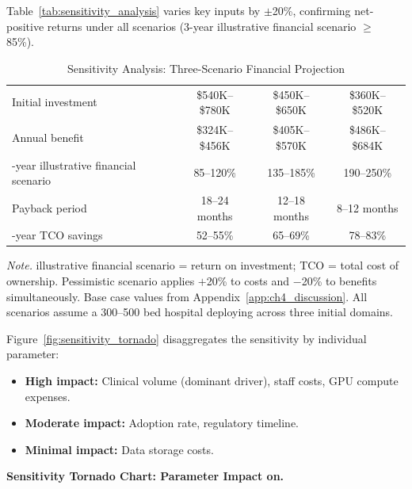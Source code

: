 Table~\ref{tab:sensitivity_analysis} varies key inputs by $\pm$20\%, confirming net-positive returns under all scenarios (3-year illustrative financial scenario $\geq$ 85\%).

\begin{table}[H]
\tablestripes
\tablefontsize
\caption{Sensitivity Analysis: Three-Scenario Financial Projection}
\begin{tabularx}{\textwidth}{@{} L C C C @{}}
\toprule
{} &  &  &  \\
\midrule
Initial investment & \$540K--\$780K & \$450K--\$650K & \$360K--\$520K \\
\addlinespace
Annual benefit & \$324K--\$456K & \$405K--\$570K & \$486K--\$684K \\
-year illustrative financial scenario & 85--120\% & 135--185\% & 190--250\% \\
\addlinespace
Payback period & 18--24 months & 12--18 months & 8--12 months \\
-year TCO savings & 52--55\% & 65--69\% & 78--83\% \\
\bottomrule
\end{tabularx}
\vspace{0.5em}\noindent\textit{Note.} illustrative financial scenario = return on investment; TCO = total cost of ownership. Pessimistic scenario applies $+$20\% to costs and $-$20\% to benefits simultaneously. Base case values from Appendix~\ref{app:ch4_discussion}. All scenarios assume a 300--500 bed hospital deploying across three initial domains.
\end{table}
\fi

Figure~\ref{fig:sensitivity_tornado} disaggregates the sensitivity by individual parameter:

\begin{itemize}
    \item \textbf{High impact:} Clinical volume (dominant driver), staff costs, GPU compute expenses.
    \item \textbf{Moderate impact:} Adoption rate, regulatory timeline.
    \item \textbf{Minimal impact:} Data storage costs.
\end{itemize}


\noindent\textbf{Sensitivity Tornado Chart: Parameter Impact on.}

